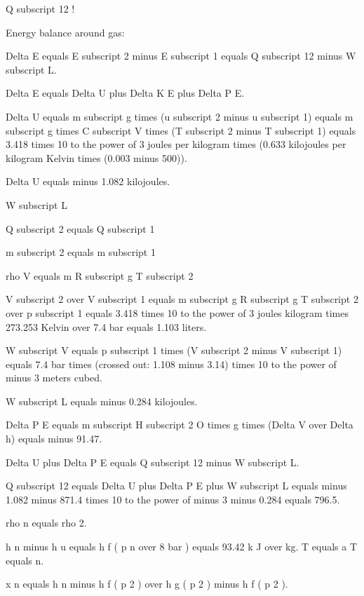 Q subscript 12 !

Energy balance around gas:

Delta E equals E subscript 2 minus E subscript 1 equals Q subscript 12 minus W subscript L.

Delta E equals Delta U plus Delta K E plus Delta P E.

Delta U equals m subscript g times (u subscript 2 minus u subscript 1) equals m subscript g times C subscript V times (T subscript 2 minus T subscript 1) equals 3.418 times 10 to the power of 3 joules per kilogram times (0.633 kilojoules per kilogram Kelvin times (0.003 minus 500)).

Delta U equals minus 1.082 kilojoules.

W subscript L

Q subscript 2 equals Q subscript 1

m subscript 2 equals m subscript 1

rho V equals m R subscript g T subscript 2

V subscript 2 over V subscript 1 equals m subscript g R subscript g T subscript 2 over p subscript 1 equals 3.418 times 10 to the power of 3 joules kilogram times 273.253 Kelvin over 7.4 bar equals 1.103 liters.

W subscript V equals p subscript 1 times (V subscript 2 minus V subscript 1) equals 7.4 bar times (crossed out: 1.108 minus 3.14) times 10 to the power of minus 3 meters cubed.

W subscript L equals minus 0.284 kilojoules.

Delta P E equals m subscript H subscript 2 O times g times (Delta V over Delta h) equals minus 91.47.

Delta U plus Delta P E equals Q subscript 12 minus W subscript L.

Q subscript 12 equals Delta U plus Delta P E plus W subscript L equals minus 1.082 minus 871.4 times 10 to the power of minus 3 minus 0.284 equals 796.5.

rho n equals rho 2.

h n minus h u equals h f ( p n over 8 bar ) equals 93.42 k J over kg. T equals a T equals n.

x n equals h n minus h f ( p 2 ) over h g ( p 2 ) minus h f ( p 2 ).